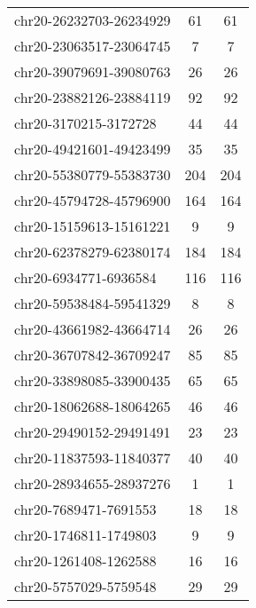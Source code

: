 \begin{longtable}{lSS}
	chr20-26232703-26234929 & 61     & 61                                  \\
	chr20-23063517-23064745 & 7      & 7                                   \\
	chr20-39079691-39080763 & 26     & 26                                  \\
	chr20-23882126-23884119 & 92     & 92                                  \\
	chr20-3170215-3172728   & 44     & 44                                  \\
	chr20-49421601-49423499 & 35     & 35                                  \\
	chr20-55380779-55383730 & 204    & 204                                 \\
	chr20-45794728-45796900 & 164    & 164                                 \\
	chr20-15159613-15161221 & 9      & 9                                   \\
	chr20-62378279-62380174 & 184    & 184                                 \\
	chr20-6934771-6936584   & 116    & 116                                 \\
	chr20-59538484-59541329 & 8      & 8                                   \\
	chr20-43661982-43664714 & 26     & 26                                  \\
	chr20-36707842-36709247 & 85     & 85                                  \\
	chr20-33898085-33900435 & 65     & 65                                  \\
	chr20-18062688-18064265 & 46     & 46                                  \\
	chr20-29490152-29491491 & 23     & 23                                  \\
	chr20-11837593-11840377 & 40     & 40                                  \\
	chr20-28934655-28937276 & 1      & 1                                   \\
	chr20-7689471-7691553   & 18     & 18                                  \\
	chr20-1746811-1749803   & 9      & 9                                   \\
	chr20-1261408-1262588   & 16     & 16                                  \\
	chr20-5757029-5759548   & 29     & 29                                  \\

\end{longtable}
